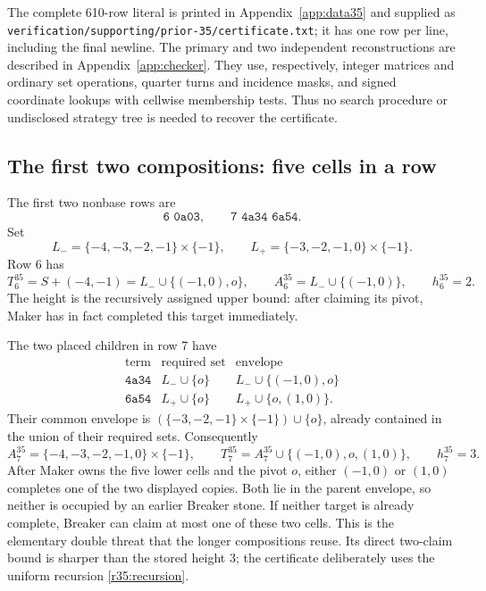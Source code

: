 The complete 610-row literal is printed in Appendix~\ref{app:data35}
and supplied as \nolinkurl{verification/supporting/prior-35/certificate.txt}; it has
one row per line, including the final newline.  The primary and two
independent reconstructions are described in Appendix~\ref{app:checker}.
They use, respectively,
integer matrices and ordinary set operations, quarter turns and
incidence masks, and signed coordinate lookups with cellwise membership
tests.  Thus no search procedure or undisclosed strategy tree is needed
to recover the certificate.

\subsection{The first two compositions: five cells in a row}
\label{r35:elementary}

The first two nonbase rows are
\[
 \texttt{6 0a03},\qquad \texttt{7 4a34 6a54}.
\]
Set
\[
 L_- = \{-4,-3,-2,-1\}\times\{-1\},\qquad
 L_+ = \{-3,-2,-1,0\}\times\{-1\}.
\]
Row 6 has
\[
 T_6^{35}=S+(-4,-1)=L_-\cup\{(-1,0),o\},\qquad
 A_6^{35}=L_-\cup\{(-1,0)\},\qquad h_6^{35}=2.
\]
The height is the recursively assigned upper bound: after claiming its
pivot, Maker has in fact completed this target immediately.

The two placed children in row 7 have
\begin{equation}\label{r35:elementary-children}
\begin{array}{c|c|c}
\text{term}&\text{required set}&\text{envelope}\\ \hline
\texttt{4a34}&L_-\cup\{o\}&L_-\cup\{(-1,0),o\}\\
\texttt{6a54}&L_+\cup\{o\}&L_+\cup\{o,(1,0)\}.
\end{array}
\end{equation}
Their common envelope is
\((\{-3,-2,-1\}\times\{-1\})\cup\{o\}\), already contained in the
union of their required sets.  Consequently
\[
 A_7^{35}=\{-4,-3,-2,-1,0\}\times\{-1\},\qquad
 T_7^{35}=A_7^{35}\cup\{(-1,0),o,(1,0)\},\qquad h_7^{35}=3.
\]
After Maker owns the five lower cells and the pivot \(o\), either
\((-1,0)\) or \((1,0)\) completes one of the two displayed copies.
Both lie in the parent envelope, so neither is occupied by an earlier
Breaker stone.  If neither target is already complete, Breaker can
claim at most one of these two cells.  This is the elementary double
threat that the longer compositions reuse.  Its direct two-claim bound
is sharper than the stored height 3; the certificate deliberately uses
the uniform recursion \eqref{r35:recursion}.

